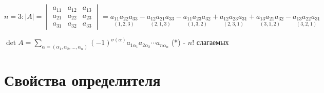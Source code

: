 $n=3: |A|=\begin{vmatrix}
a_{11} & a_{12} & a_{13} \\ 
a_{21} & a_{22} & a_{23} \\
a_{31} & a_{32} & a_{33}
\end{vmatrix}=\underset{(1,2,3)}{a_{11}a_{22}a_{33}}-\underset{(2,1,3)}{a_{12}a_{21}a_{33}}-\underset{(1,3,2)}{a_{11}a_{23}a_{32}}+\underset{(2,3,1)}{a_{12}a_{23}a_{31}}+\underset{(3,1,2)}{a_{13}a_{21}a_{32}}-\underset{(3,2,1)}{a_{13}a_{22}a_{31}}$

$\det A=\sum\limits_{\alpha=(\alpha_1,\alpha_2,\ldots,\alpha_n)}(-1)^{\sigma(\alpha)}a_{1\alpha_1}a_{2\alpha_2}\cdots{}a_{n\alpha_n}$ (*) - $n!$ слагаемых
\section{Свойства определителя}
